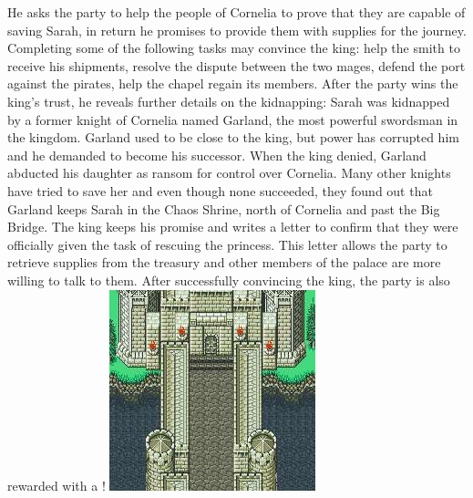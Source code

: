 He asks the party to help the people of Cornelia to prove that they are capable of saving Sarah, in return he promises to provide them with supplies for the journey.
Completing some of the following tasks may convince the king: help the smith to receive his shipments, resolve the dispute between the two mages, defend the port against the pirates, help the chapel regain its members.
After the party wins the king's trust, he reveals further details on the kidnapping:
Sarah was kidnapped by a former knight of Cornelia named Garland, the most powerful swordsman in the kingdom.
Garland used to be close to the king, but power has corrupted him and he demanded to become his successor. 
When the king denied, Garland abducted his daughter as ransom for control over Cornelia.
Many other knights have tried to save her and even though none succeeded, they found out that Garland keeps Sarah in the Chaos Shrine, north of Cornelia and past the Big Bridge.
The king keeps his promise and writes a letter to confirm that they were officially given the task of rescuing the princess.
This letter allows the party to retrieve supplies from the treasury and other members of the palace are more willing to talk to them.
After successfully convincing the king, the party is also rewarded with a !
%
\ofpar
%
\includegraphics[width=\columnwidth]{./art/chaosincornelia/bridge.jpg} 
%
\\\\
